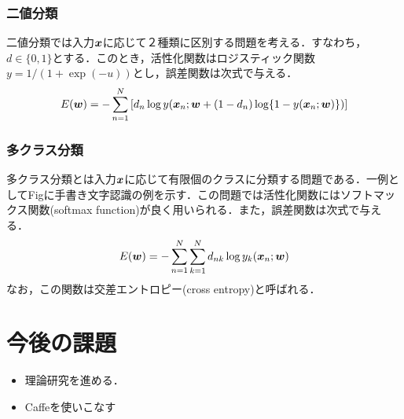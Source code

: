 \documentclass[a4paper,10pt]{jsarticle}
\def\vec#1{\mbox{\boldmath$#1$}}
\begin{document}
\subsubsection{二値分類}
二値分類では入力$\vec{x}$に応じて２種類に区別する問題を考える．すなわち，$d\in\{0,1\}$とする．このとき，活性化関数はロジスティック関数$y=1/(1+\exp(-u))$とし，誤差関数は次式で与える．
\begin{eqnarray}
 E(\vec{w})=-\sum^{N}_{n=1}\left[d_{n}\log y(\vec{x}_{n};\vec{w} + (1-d_{n})\log\{1-y(\vec{x}_{n};\vec{w})\})\right]\label{000654_27Jun15}
\end{eqnarray}

\subsubsection{多クラス分類}
多クラス分類とは入力$\vec{x}$に応じて有限個のクラスに分類する問題である．一例としてFigに手書き文字認識の例を示す．この問題では活性化関数にはソフトマックス関数(softmax function)が良く用いられる．また，誤差関数は次式で与える．
\begin{eqnarray}
 E(\vec{w})=-\sum^{N}_{n=1}\sum^{N}_{k=1}d_{nk}\log y_{k}(\vec{x}_{n};\vec{w})\label{000700_27Jun15}
\end{eqnarray}
なお，この関数は交差エントロピー(cross entropy)と呼ばれる．
\section{今後の課題}
\begin{itemize}
 \item 理論研究を進める．
 \item Caffeを使いこなす
\end{itemize}
\end{document}

